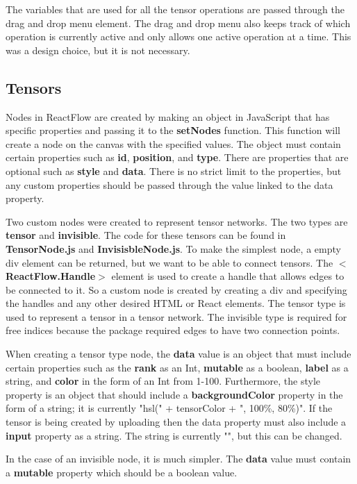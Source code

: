 \documentclass{juliacon}
\begin{document}
\begin{appendix}
The variables that are used for all the tensor operations are passed through the drag and drop menu element. The drag and drop menu also keeps track of which operation is currently active and only allows one active operation at a time. This was a design choice, but it is not necessary.

\subsection{Tensors}
Nodes in ReactFlow are created by making an object in JavaScript that has specific properties and passing it to the \textbf{setNodes} function. This function will create a node on the canvas with the specified values. The object must contain certain properties such as \textbf{id}, \textbf{position}, and \textbf{type}. There are properties that are optional such as \textbf{style} and \textbf{data}. There is no strict limit to the properties, but any custom properties should be passed through the value linked to the data property.

Two custom nodes were created to represent tensor networks. The two types are \textbf{tensor} and \textbf{invisible}. The code for these tensors can be found in \textbf{TensorNode.js} and \textbf{InvisisbleNode.js}. To make the simplest node, a empty div element can be returned, but we want to be able to connect tensors. The $<$\textbf{ReactFlow.Handle}$>$ element is used to create a handle that allows edges to be connected to it. So a custom node is created by creating a div and specifying the handles and any other desired HTML or React elements. The tensor type is used to represent a tensor in a tensor network. The invisible type is required for free indices because the package required edges to have two connection points.

When creating a tensor type node, the \textbf{data} value is an object that must include certain properties such as the \textbf{rank} as an Int, \textbf{mutable} as a boolean, \textbf{label} as a string, and \textbf{color} in the form of an Int from 1-100. Furthermore, the style property is an object that should include a \textbf{backgroundColor} property in the form of a string; it is currently "hsl(" + tensorColor + ", 100\%, 80\%)". If the tensor is being created by uploading then the data property must also include a \textbf{input} property as a string. The string is currently "", but this can be changed. 

In the case of an invisible node, it is much simpler. The \textbf{data} value must contain a \textbf{mutable} property which should be a boolean value. 


\end{appendix}
\end{document}

